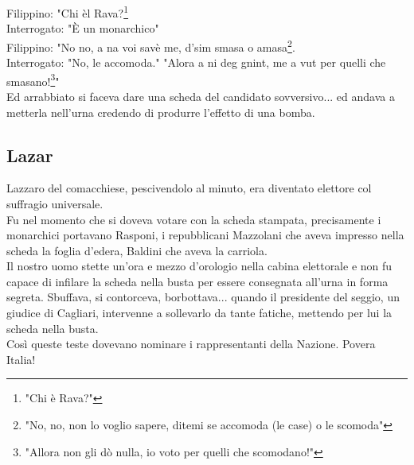 \documentclass[10pt]{memoir} %
\begin{document}
Filippino: "Chi èl Rava?\footnote{"Chi è Rava?"}\\
Interrogato: "È un monarchico"\\
Filippino: "No no, a na voi savè me, d'sim smasa o amasa\footnote{"No, no, non lo voglio sapere, ditemi se accomoda (le case) o le scomoda"}.\\
Interrogato: "No, le accomoda."
"Alora a ni deg gnint, me a vut per quelli che smasano!\footnote{"Allora non gli dò nulla, io voto per quelli che scomodano!"}"\\
Ed arrabbiato si faceva dare una scheda del candidato sovversivo... ed andava a metterla nell'urna credendo di produrre l'effetto di una bomba.\\
\subsection{Lazar}
Lazzaro del comacchiese, pescivendolo al minuto, era diventato elettore col suffragio universale.\\
Fu nel momento che si doveva votare con la scheda stampata, precisamente i monarchici portavano Rasponi, i repubblicani Mazzolani che aveva impresso nella scheda la foglia d'edera, Baldini che aveva la carriola.\\
Il nostro uomo stette un'ora e mezzo d'orologio nella cabina elettorale e non fu capace di infilare la scheda nella busta per essere consegnata all'urna in forma segreta. Sbuffava, si contorceva, borbottava... quando il presidente del seggio, un giudice di Cagliari, intervenne a sollevarlo da tante fatiche, mettendo per lui la scheda nella busta.\\
Così queste teste dovevano nominare i rappresentanti della Nazione. Povera Italia!

\end{document}
